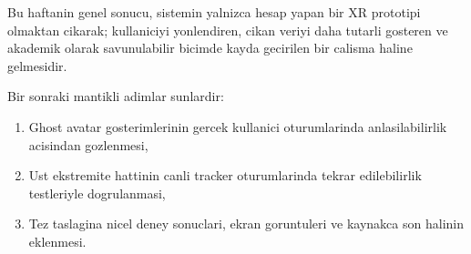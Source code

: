 \documentclass[11pt,a4paper]{article}
\begin{document}
Bu haftanin genel sonucu, sistemin yalnizca hesap yapan bir XR prototipi olmaktan
cikarak; kullaniciyi yonlendiren, cikan veriyi daha tutarli gosteren ve
akademik olarak savunulabilir bicimde kayda gecirilen bir calisma haline
gelmesidir.

Bir sonraki mantikli adimlar sunlardir:

\begin{enumerate}[nosep]
    \item Ghost avatar gosterimlerinin gercek kullanici oturumlarinda anlasilabilirlik acisindan gozlenmesi,
    \item Ust ekstremite hattinin canli tracker oturumlarinda tekrar edilebilirlik testleriyle dogrulanmasi,
    \item Tez taslagina nicel deney sonuclari, ekran goruntuleri ve kaynakca son halinin eklenmesi.
\end{enumerate}
\end{document}
